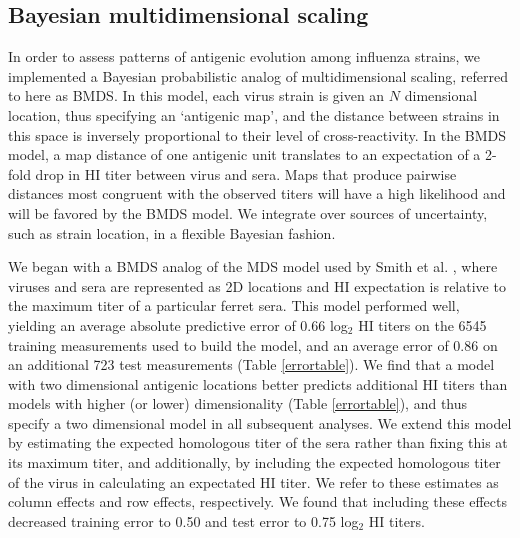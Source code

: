 \documentclass[11pt,oneside,letterpaper]{article}
\begin{document}
\subsection*{Bayesian multidimensional scaling}

In order to assess patterns of antigenic evolution among influenza strains, we implemented a Bayesian probabilistic analog of multidimensional scaling, referred to here as BMDS.
In this model, each virus strain is given an $N$ dimensional location, thus specifying an `antigenic map', and the distance between strains in this space is inversely proportional to their level of cross-reactivity.
In the BMDS model, a map distance of one antigenic unit translates to an expectation of a 2-fold drop in HI titer between virus and sera.
Maps that produce pairwise distances most congruent with the observed titers will have a high likelihood and will be favored by the BMDS model.
We integrate over sources of uncertainty, such as strain location, in a flexible Bayesian fashion.

We began with a BMDS analog of the MDS model used by Smith et al. \cite{Smith04}, where viruses and sera are represented as 2D locations and HI expectation is relative to the maximum titer of a particular ferret sera.
This model performed well, yielding an average absolute predictive error of 0.66 log$_2$ HI titers on the 6545 training measurements used to build the model, and an average error of 0.86 on an additional 723 test measurements (Table \ref{errortable}).
We find that a model with two dimensional antigenic locations better predicts additional HI titers than models with higher (or lower) dimensionality (Table \ref{errortable}), and thus specify a two dimensional model in all subsequent analyses.
We extend this model by estimating the expected homologous titer of the sera rather than fixing this at its maximum titer, and additionally, by including the expected homologous titer of the virus in calculating an expectated HI titer.
We refer to these estimates as column effects and row effects, respectively.
We found that including these effects decreased training error to 0.50 and test error to 0.75 log$_2$ HI titers.
\end{document}
